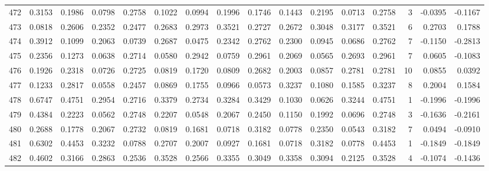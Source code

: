 \begin{tabular}{lrrrrrrrrrrrrrrr}
472 &      0.3153 &  0.1986 &  0.0798 &  0.2758 &  0.1022 &  0.0994 &  0.1996 &  0.1746 &  0.1443 &  0.2195 &   0.0713 &     0.2758 &      3 &                   -0.0395 &                    -0.1167 \\
473 &      0.0818 &  0.2606 &  0.2352 &  0.2477 &  0.2683 &  0.2973 &  0.3521 &  0.2727 &  0.2672 &  0.3048 &   0.3177 &     0.3521 &      6 &                    0.2703 &                     0.1788 \\
474 &      0.3912 &  0.1099 &  0.2063 &  0.0739 &  0.2687 &  0.0475 &  0.2342 &  0.2762 &  0.2300 &  0.0945 &   0.0686 &     0.2762 &      7 &                   -0.1150 &                    -0.2813 \\
475 &      0.2356 &  0.1273 &  0.0638 &  0.2714 &  0.0580 &  0.2942 &  0.0759 &  0.2961 &  0.2069 &  0.0565 &   0.2693 &     0.2961 &      7 &                    0.0605 &                    -0.1083 \\
476 &      0.1926 &  0.2318 &  0.0726 &  0.2725 &  0.0819 &  0.1720 &  0.0809 &  0.2682 &  0.2003 &  0.0857 &   0.2781 &     0.2781 &     10 &                    0.0855 &                     0.0392 \\
477 &      0.1233 &  0.2817 &  0.0558 &  0.2457 &  0.0869 &  0.1755 &  0.0966 &  0.0573 &  0.3237 &  0.1080 &   0.1585 &     0.3237 &      8 &                    0.2004 &                     0.1584 \\
478 &      0.6747 &  0.4751 &  0.2954 &  0.2716 &  0.3379 &  0.2734 &  0.3284 &  0.3429 &  0.1030 &  0.0626 &   0.3244 &     0.4751 &      1 &                   -0.1996 &                    -0.1996 \\
479 &      0.4384 &  0.2223 &  0.0562 &  0.2748 &  0.2207 &  0.0548 &  0.2067 &  0.2450 &  0.1150 &  0.1992 &   0.0696 &     0.2748 &      3 &                   -0.1636 &                    -0.2161 \\
480 &      0.2688 &  0.1778 &  0.2067 &  0.2732 &  0.0819 &  0.1681 &  0.0718 &  0.3182 &  0.0778 &  0.2350 &   0.0543 &     0.3182 &      7 &                    0.0494 &                    -0.0910 \\
481 &      0.6302 &  0.4453 &  0.3232 &  0.0788 &  0.2707 &  0.2007 &  0.0927 &  0.1681 &  0.0718 &  0.3182 &   0.0778 &     0.4453 &      1 &                   -0.1849 &                    -0.1849 \\
482 &      0.4602 &  0.3166 &  0.2863 &  0.2536 &  0.3528 &  0.2566 &  0.3355 &  0.3049 &  0.3358 &  0.3094 &   0.2125 &     0.3528 &      4 &                   -0.1074 &                    -0.1436 \\

\end{tabular}
